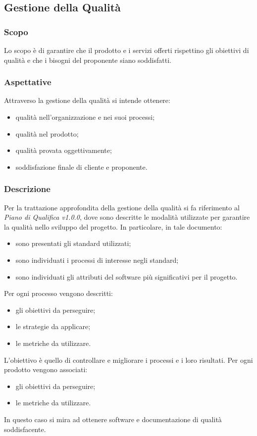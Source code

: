\subsection{Gestione della Qualità}
	\subsubsection{Scopo}
	Lo scopo è di garantire che il prodotto e i servizi offerti rispettino gli obiettivi di qualità e che i bisogni del proponente siano soddisfatti.
	\subsubsection{Aspettative}
	Attraverso la gestione della qualità si intende ottenere:
	\begin{itemize}
		\item qualità nell'organizzazione e nei suoi processi;
		\item qualità nel prodotto;
		\item qualità provata oggettivamente;
		\item soddisfazione finale di cliente e proponente.
	\end{itemize}
	\subsubsection{Descrizione}
	Per la trattazione approfondita della gestione della qualità si fa riferimento al \textit{Piano di Qualifica v1.0.0}, dove sono descritte le modalità utilizzate per garantire la qualità nello sviluppo del progetto. In particolare, in tale documento:
	\begin{itemize}
		\item sono presentati gli standard utilizzati;
		\item sono individuati i processi di interesse negli standard;
		\item sono individuati gli attributi del software più significativi per il progetto.
	\end{itemize}
	Per ogni processo vengono descritti:
	\begin{itemize}
		\item gli obiettivi da perseguire;
		\item le strategie da applicare;
		\item le metriche da utilizzare.
	\end{itemize}
	L'obiettivo è quello di controllare e migliorare i processi e i loro risultati.
	Per ogni prodotto vengono associati:
	\begin{itemize}
		\item gli obiettivi da perseguire;
		\item le metriche da utilizzare.
	\end{itemize}
	In questo caso si mira ad ottenere software e documentazione di qualità soddisfacente.
